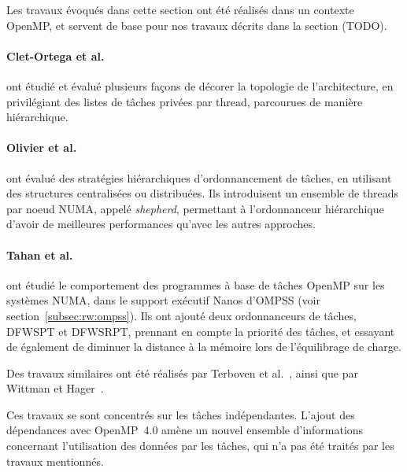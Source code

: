 Les travaux évoqués dans cette section ont été réalisés dans un contexte OpenMP, et servent de base pour nos travaux décrits dans la section (TODO).

\paragraph{Clet-Ortega et al.~\cite{Clet2014}} ont étudié et évalué plusieurs façons de décorer la topologie de l'architecture, en privilégiant des listes de tâches privées par thread, parcourues de manière hiérarchique.

\paragraph{Olivier et al.~\cite{Olivier2012}} ont évalué des stratégies hiérarchiques d'ordonnancement de tâches, en utilisant des structures centralisées ou distribuées.
Ils introduisent un ensemble de threads par noeud NUMA, appelé \emph{shepherd}, permettant à l'ordonnanceur hiérarchique d'avoir de meilleures performances qu'avec les autres approches.


\paragraph{Tahan et al.~\cite{Tahan2014}} ont étudié le comportement des programmes à base de tâches OpenMP sur les systèmes NUMA, dans le support exécutif Nanos d'OMPSS (voir section~\ref{subsec:rw:ompss}).
Ils ont ajouté deux ordonnanceurs de tâches, DFWSPT et DFWSRPT, prennant en compte la priorité des tâches, et essayant de également de diminuer la distance à la mémoire lors de l'équilibrage de charge.

Des travaux similaires ont été réalisés par Terboven et al.~\cite{Terboven2012}, ainsi que par Wittman et Hager~\cite{Wittmann2011}.


Ces travaux se sont concentrés sur les tâches indépendantes.
L'ajout des dépendances avec OpenMP~4.0 amène un nouvel ensemble d'informations concernant l'utilisation des données par les tâches, qui n'a pas été traités par les travaux mentionnés.

